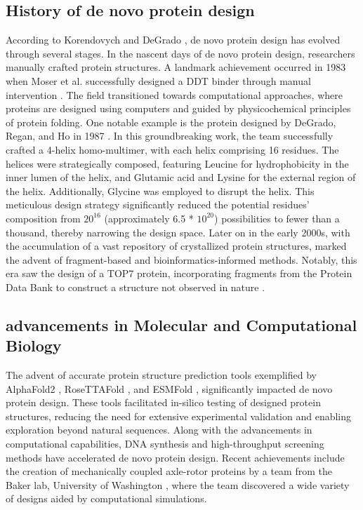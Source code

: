 \documentclass[11pt,a4paper]{article}
\begin{document}
\subsection{History of de novo protein design}

According to Korendovych and DeGrado \cite{korendovych2020novo}, de 
novo protein design has evolved through several stages.
In the nascent days of de novo protein design, researchers manually 
crafted protein structures. A landmark achievement occurred in 1983 
when Moser et al. successfully designed a DDT binder through manual 
intervention \cite{moser1983artificial}.
The field transitioned towards computational approaches, where proteins 
are designed using computers and guided by physicochemical principles 
of protein folding. One notable example is the protein designed by 
DeGrado, Regan, and Ho in 1987 \cite{degrado1987design}. In this 
groundbreaking work, the team successfully crafted a 4-helix 
homo-multimer, with each helix comprising 16 residues. The helices were 
strategically composed, featuring Leucine for hydrophobicity in the 
inner lumen of the helix, and Glutamic acid and Lysine for the external 
region of the helix. Additionally, Glycine was employed to disrupt the 
helix. This meticulous design strategy significantly reduced the 
potential residues' composition from $20^{16}$ (approximately 6.5 * $10^
{20}$) possibilities to fewer than a thousand, thereby narrowing the 
design space. 
Later on in the early 2000s, with the accumulation of a vast repository 
of crystallized protein structures,  marked the advent of 
fragment-based and bioinformatics-informed methods. Notably, this era 
saw the design of a  TOP7 protein, incorporating fragments from the 
Protein Data Bank to construct a structure not observed in nature \cite
{kuhlman2003design}.

\subsection{advancements in Molecular and Computational Biology}

The advent of accurate protein structure prediction tools exemplified 
by AlphaFold2 \cite{jumper2021highly}, RoseTTAFold \cite
{baek2021accurate}, and ESMFold \cite{lin2022language}, significantly 
impacted de novo protein design. These tools facilitated in-silico 
testing of designed protein structures, reducing the need for extensive 
experimental validation and enabling exploration beyond natural 
sequences.
Along with the advancements in computational capabilities, DNA synthesis 
and high-throughput screening methods have accelerated de novo protein 
design. Recent achievements include the creation of mechanically 
coupled  axle-rotor proteins by a team from the Baker lab, University 
of Washington \cite{courbet2022computational}, where the team 
discovered a wide variety of designs aided by computational simulations.
\end{document}
